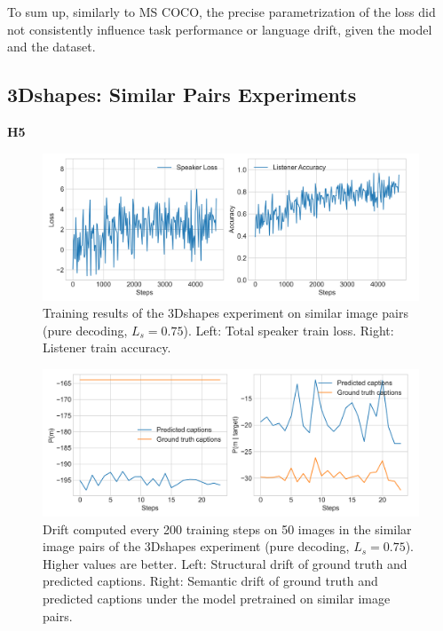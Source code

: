 To sum up, similarly to MS COCO, the precise parametrization of the loss did not consistently influence task performance or language drift, given the model and the dataset.

\subsection{3Dshapes: Similar Pairs Experiments}
\label{expt:3dsapes_similar}

\textbf{H5}

\begin{figure}
	\centering
	\includegraphics[width=\linewidth]{images/3dshapes_refgame_49_pure_075_similar.png}
	\caption{Training results of the 3Dshapes experiment on similar image pairs (pure decoding, $L_s = 0.75$). Left: Total speaker train loss. Right: Listener train accuracy.}
	\label{fig:3dshapes_similar_075_speaker_loss_listener_acc}
\end{figure}


\begin{figure}
	\centering
	\includegraphics[width=\linewidth]{images/3dshapes_structural_semantic_drift_4000_pure_075_similar.png}
	\caption{Drift computed every 200 training steps on 50 images in the similar image pairs of the 3Dshapes experiment (pure decoding, $L_s = 0.75$). Higher values are better. Left: Structural drift of ground truth and predicted captions. Right: Semantic drift of ground truth and predicted captions under the model pretrained on similar image pairs.} 
	\label{fig:3dshapes_similar_075_str_sem_drift}
\end{figure}

